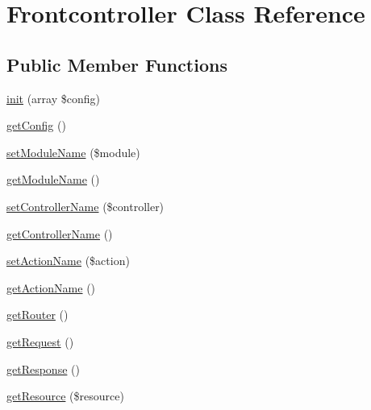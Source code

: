 \hypertarget{class_anemo_1_1_controller_1_1_frontcontroller}{
\section{Frontcontroller Class Reference}
\label{class_anemo_1_1_controller_1_1_frontcontroller}
}
\subsection*{Public Member Functions}
\begin{DoxyCompactItemize}
\item 
\hyperlink{class_anemo_1_1_controller_1_1_frontcontroller_adb7ebaf24d4b5aa433136dc2117854fc}{init} (array \$config)
\item 
\hyperlink{class_anemo_1_1_controller_1_1_frontcontroller_a628300eb8464467d9344c7c59cc8770b}{getConfig} ()
\item 
\hyperlink{class_anemo_1_1_controller_1_1_frontcontroller_ace12d039551ac52a70b0629a519fae41}{setModuleName} (\$module)
\item 
\hyperlink{class_anemo_1_1_controller_1_1_frontcontroller_a7e79740a77d43616dc9e0976f603fb7a}{getModuleName} ()
\item 
\hyperlink{class_anemo_1_1_controller_1_1_frontcontroller_a4e3aa0a1a35106bea24cd0cff17a661e}{setControllerName} (\$controller)
\item 
\hyperlink{class_anemo_1_1_controller_1_1_frontcontroller_a1b465007a1196146db46a2890a1391a8}{getControllerName} ()
\item 
\hyperlink{class_anemo_1_1_controller_1_1_frontcontroller_a3b9d4e3945e398b30382c80056b5083a}{setActionName} (\$action)
\item 
\hyperlink{class_anemo_1_1_controller_1_1_frontcontroller_a26f353f733e6f7a64eaeba330af5770e}{getActionName} ()
\item 
\hyperlink{class_anemo_1_1_controller_1_1_frontcontroller_a392437718b3e58299cf673d44af6151e}{getRouter} ()
\item 
\hyperlink{class_anemo_1_1_controller_1_1_frontcontroller_adf1a35ad20e475c59cc0967d5764aa22}{getRequest} ()
\item 
\hyperlink{class_anemo_1_1_controller_1_1_frontcontroller_a6c907e8af775e517a77037dd0164222f}{getResponse} ()
\item 
\hyperlink{class_anemo_1_1_controller_1_1_frontcontroller_aa2c1b8634bea77c8eb6a7d909511bd52}{getResource} (\$resource)
\item 

\end{DoxyCompactItemize}
